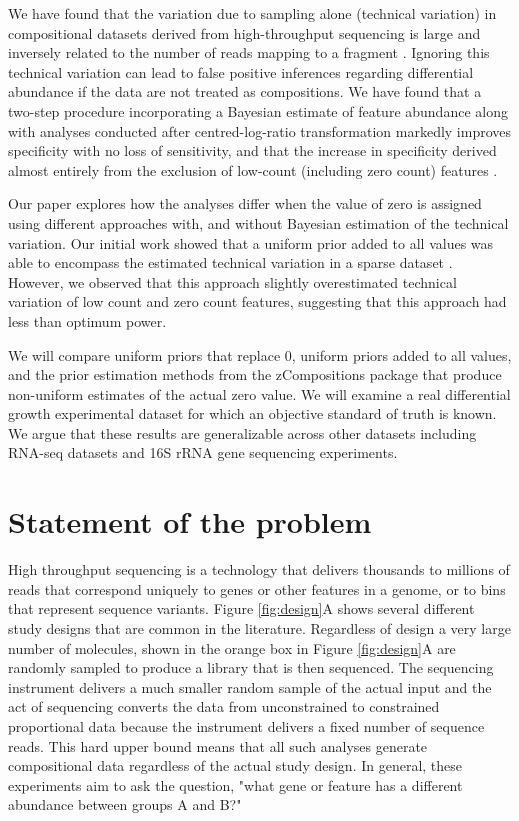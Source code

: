 \documentclass[article]{ajs}\usepackage[]{graphicx}\usepackage[]{color}
\begin{document}
We have found that the variation due to sampling alone (technical variation) in compositional datasets derived from high-throughput sequencing is large and inversely related to the number of reads mapping to a fragment  \citep{fernandes:2013}. Ignoring this technical variation can lead to false positive inferences regarding differential abundance if the data are not treated as  compositions. We have found  that a two-step procedure  incorporating a Bayesian estimate of feature abundance along with analyses conducted after centred-log-ratio transformation markedly improves specificity with no loss of sensitivity, and that the increase in specificity derived almost entirely from the exclusion of low-count (including zero count) features  \citep{fernandes:2014}. 

Our paper  explores how the analyses differ when the value of zero is assigned using different approaches with, and without Bayesian estimation of the technical variation. Our initial work showed that a uniform prior added to all values was able to  encompass the estimated technical variation in a sparse dataset  \citep{fernandes:2013}. However, we observed that this approach slightly overestimated technical variation of low count and zero count features, suggesting that this approach had less than optimum power.

We will compare uniform priors that replace 0,  uniform priors added to all values, and the prior estimation methods from the zCompositions  package \citep{PalareaAlbaladejo201585} that produce non-uniform estimates of the actual zero value. We will examine a real differential growth experimental dataset for which an objective standard of truth is known. We argue that these results are generalizable across other datasets including RNA-seq datasets and 16S rRNA gene sequencing experiments. 

\section{Statement of the problem}

\vskip-0.25cm 
High throughput sequencing is a technology that delivers thousands to millions of reads that correspond uniquely to genes or other features in a genome, or to bins that represent sequence variants. Figure \ref{fig:design}A shows several different study designs that are common in the literature. Regardless of design a very large number of molecules, shown in the orange box in Figure \ref{fig:design}A are randomly sampled to produce a library that is then sequenced. The sequencing instrument delivers a much smaller random sample of the actual input and the act of sequencing converts the data from unconstrained to constrained proportional data because the instrument delivers a fixed number of sequence reads. This hard upper bound means that all such analyses generate compositional data regardless of the actual study design. In general, these experiments aim to ask the question, "what gene or feature has a different abundance between groups A and B?"
\end{document}
